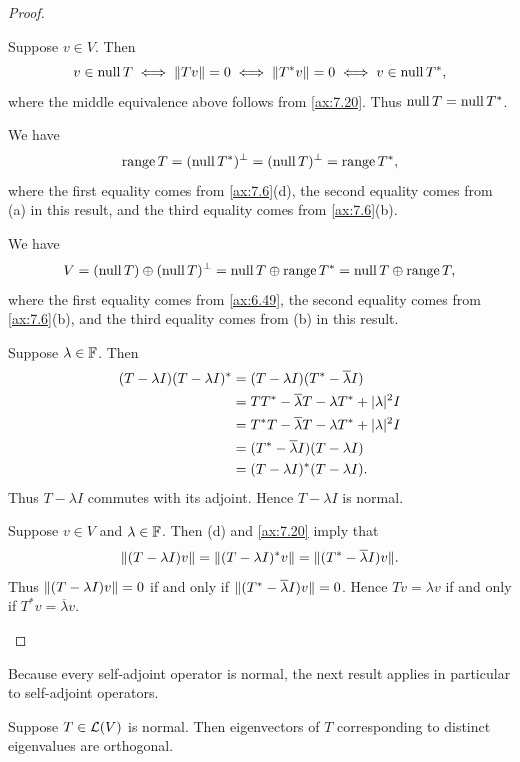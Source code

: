 \begin{proof}\leavevmode
\begin{parts}
\item Suppose $v\in V$. Then
  \[ v\in\operatorname{null} T \iff \lVert Tv \rVert=0 \iff \lVert T^*v \rVert=0 \iff v\in\operatorname{null} T^*, \]
  where the middle equivalence above follows from \ref{ax:7.20}. Thus
  $\operatorname{null} T=\operatorname{null} T^*$.
\item We have
  \[ \operatorname{range} T = (\operatorname{null} T^*)^\perp = (\operatorname{null} T)^\perp = \operatorname{range} T^*, \]
  where the first equality comes from \ref{ax:7.6}(d), the second equality
  comes from (a) in this result, and the third equality comes from
  \ref{ax:7.6}(b).
\item We have
  \[ V = (\operatorname{null} T)\oplus(\operatorname{null} T)^\perp = \operatorname{null} T\oplus\operatorname{range} T^*
       = \operatorname{null} T\oplus\operatorname{range} T, \]
  where the first equality comes from \ref{ax:6.49}, the second equality comes
  from \ref{ax:7.6}(b), and the third equality comes from (b) in this result.
\item Suppose $\lambda\in\mathbb{F}$. Then
  \begin{align*}
  (T-\lambda I)(T-\lambda I)^* &= (T-\lambda I)(T^*-\overline{\lambda}I)\\
    &= TT^*-\overline{\lambda}T-\lambda T^*+\lvert \lambda \rvert^2I\\
    &= T^*T-\overline{\lambda}T-\lambda T^*+\lvert \lambda \rvert^2I\\
    &= (T^*-\overline{\lambda}I)(T-\lambda I)\\
    &= (T-\lambda I)^*(T-\lambda I).
  \end{align*}
  Thus $T-\lambda I$ commutes with its adjoint. Hence $T-\lambda I$ is normal.
\item Suppose $v\in V$ and $\lambda\in\mathbb{F}$. Then (d) and \ref{ax:7.20} imply that
  \[ \lVert (T-\lambda I)v \rVert = \lVert (T-\lambda I)^*v \rVert
     = \lVert (T^*-\overline{\lambda}I)v \rVert. \]
  Thus $\lVert (T-\lambda I)v \rVert=0$ if and only if
  $\lVert (T^*-\overline{\lambda}I)v \rVert=0$. Hence $Tv=\lambda v$ if and only if
  $T^*v=\overline{\lambda}v$. \qedhere
\end{parts}
\end{proof}

Because every self-adjoint operator is normal, the next result applies in
particular to self-adjoint operators.

\begin{result}\label{ax:7.22}
Suppose $T\in\mathcal{L}(V)$ is normal. Then eigenvectors of $T$ corresponding to
distinct eigenvalues are orthogonal.
\end{result}

